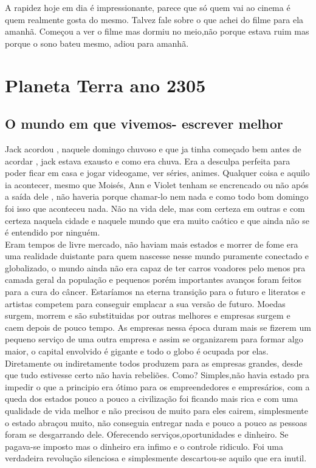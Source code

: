 \documentclass{book}
\begin{document}
 A rapidez hoje em dia é impressionante, parece que só quem vai ao cinema é quem realmente gosta do mesmo. Talvez fale sobre o que achei do filme para ela amanhã. Começou a ver o filme mas dormiu no meio,não porque estava ruim mas porque o sono bateu mesmo, adiou para amanhã.\\
 \chapter{Planeta Terra ano 2305}
 \section*{O mundo em que vivemos- escrever melhor}
 Jack acordou , naquele domingo chuvoso e que ja tinha começado bem antes de acordar , jack estava exausto e como era chuva. Era a desculpa perfeita para poder ficar em casa e jogar videogame, ver séries, animes. Qualquer coisa e aquilo ia acontecer, mesmo que Moisés, Ann e Violet tenham se encrencado ou não após a saída dele , não haveria porque chamar-lo nem nada e como todo bom domingo foi isso que aconteceu nada. Não na vida dele, mas com certeza em outras e com certeza naquela cidade e naquele mundo que era muito caótico e que ainda não se é entendido por ninguém.\\
 Eram tempos de livre mercado, não haviam mais estados e morrer de fome era uma realidade duistante para quem nascesse nesse mundo puramente conectado e globalizado, o mundo ainda não era capaz de ter carros voadores pelo menos pra camada geral da população e pequenos porém importantes avanços foram feitos para a cura do câncer. Estaríamos na eterna transição para o futuro e literatos e artistas competem para conseguir emplacar a sua versão de futuro. Moedas surgem, morrem e são substituidas por outras melhores e empresas surgem e caem depois de pouco tempo. As empresas nessa época duram mais se fizerem um pequeno serviço de uma outra empresa e assim se organizarem para formar algo maior, o capital envolvido é gigante e todo o globo é ocupada por elas. Diretamente ou indiretamente todos produzem para as empresas grandes, desde que tudo estivesse certo não havia rebeliões. Como? Simples,não havia estado pra impedir o que a principio era ótimo para os empreendedores e empresários, com a queda dos estados pouco a pouco a civilização foi ficando mais rica e com uma qualidade de vida melhor e não precisou de muito para eles cairem, simplesmente o estado abraçou muito, não conseguia entregar nada e pouco a pouco as pessoas foram se desgarrando dele. Oferecendo serviços,oportunidades e dinheiro. Se pagava-se imposto mas o dinheiro era infimo e o controle ridiculo. Foi uma verdadeira revolução silenciosa e simplesmente descartou-se aquilo que era inutil. \\
\end{document}
